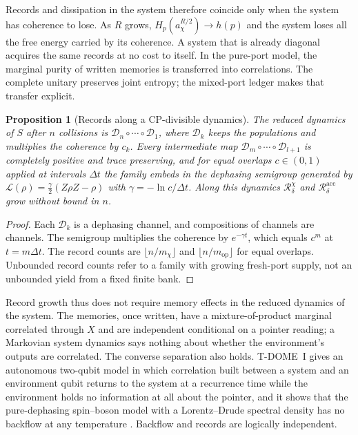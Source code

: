\documentclass[12pt,a4paper]{article}
\newtheorem{proposition}[theorem]{Proposition}
\begin{document}
Records and dissipation in the system therefore coincide only when the system has coherence to lose. As $R$ grows, $H_p(a_\chi^{R/2})\to h(p)$ and the system loses all the free energy carried by its coherence. A system that is already diagonal acquires the same records at no cost to itself. In the pure-port model, the marginal purity of written memories is transferred into correlations. The complete unitary preserves joint entropy; the mixed-port ledger makes that transfer explicit.

\begin{proposition}[Records along a CP-divisible dynamics]
\label{prop:cpdiv}
The reduced dynamics of $S$ after $n$ collisions is $\mathcal D_n\circ\cdots\circ\mathcal D_1$, where $\mathcal D_k$ keeps the populations and multiplies the coherence by $c_k$. Every intermediate map $\mathcal D_m\circ\cdots\circ\mathcal D_{l+1}$ is completely positive and trace preserving, and for equal overlaps $c\in(0,1)$ applied at intervals $\Delta t$ the family embeds in the dephasing semigroup generated by $\mathcal L(\rho)=\tfrac\gamma2(Z\rho Z-\rho)$ with $\gamma=-\ln c/\Delta t$. Along this dynamics $\mathcal R^\chi_\delta$ and $\mathcal R^{\mathrm{acc}}_\delta$ grow without bound in $n$.
\end{proposition}

\begin{proof}
Each $\mathcal D_k$ is a dephasing channel, and compositions of channels are channels. The semigroup multiplies the coherence by $e^{-\gamma t}$, which equals $c^m$ at $t=m\Delta t$. The record counts are $\lfloor n/m_\chi\rfloor$ and $\lfloor n/m_{\mathrm{op}}\rfloor$ for equal overlaps.
Unbounded record counts refer to a family with growing fresh-port supply,
not an unbounded yield from a fixed finite bank.
\end{proof}

Record growth thus does not require memory effects in the reduced dynamics of the system. The memories, once written, have a mixture-of-product marginal correlated through $X$ and are independent conditional on a pointer reading; a Markovian system dynamics says nothing about whether the environment's outputs are correlated. The converse separation also holds. T-DOME~I gives an autonomous two-qubit model in which correlation built between a system and an environment qubit returns to the system at a recurrence time while the environment holds no information at all about the pointer, and it shows that the pure-dephasing spin--boson model with a Lorentz--Drude spectral density has no backflow at any temperature \cite{Liu2026TDOME_I}. Backflow and records are logically independent.
\end{document}
